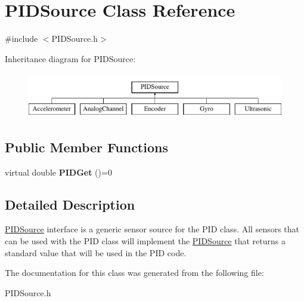 \hypertarget{classPIDSource}{\section{\-P\-I\-D\-Source \-Class \-Reference}
\label{classPIDSource}
}


{\ttfamily \#include $<$\-P\-I\-D\-Source.\-h$>$}

\-Inheritance diagram for \-P\-I\-D\-Source\-:\begin{figure}[H]
\begin{center}
\leavevmode
\includegraphics[height=2.000000cm]{classPIDSource}
\end{center}
\end{figure}
\subsection*{\-Public \-Member \-Functions}
\begin{DoxyCompactItemize}
\item 
\hypertarget{classPIDSource_adbec8669a824cab3b0b59a7fa1bae6f0}{virtual double {\bfseries \-P\-I\-D\-Get} ()=0}\label{classPIDSource_adbec8669a824cab3b0b59a7fa1bae6f0}

\end{DoxyCompactItemize}


\subsection{\-Detailed \-Description}
\hyperlink{classPIDSource}{\-P\-I\-D\-Source} interface is a generic sensor source for the \-P\-I\-D class. \-All sensors that can be used with the \-P\-I\-D class will implement the \hyperlink{classPIDSource}{\-P\-I\-D\-Source} that returns a standard value that will be used in the \-P\-I\-D code. 

\-The documentation for this class was generated from the following file\-:\begin{DoxyCompactItemize}
\item 
\-P\-I\-D\-Source.\-h\end{DoxyCompactItemize}
